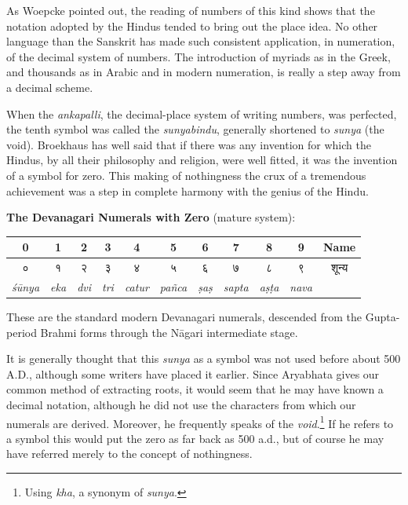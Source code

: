 \documentclass[11pt,a4paper]{article}
\newcommand{\dev}[1]{{\devanagarifont #1}}
\newenvironment{enhancednote}{%
  \begin{tcolorbox}[colback=enhancedbg,colframe=notecolor,boxrule=1pt,
    left=10pt,right=10pt,top=8pt,bottom=8pt,
    title={\textbf{Enhanced Edition Note}},fonttitle=\bfseries\color{notecolor}]
}{\end{tcolorbox}}
\begin{document}
As Woepcke pointed out, the reading of numbers of this kind shows that the notation adopted by the Hindus tended to bring out the place idea. No other language than the Sanskrit has made such consistent application, in numeration, of the decimal system of numbers. The introduction of myriads as in the Greek, and thousands as in Arabic and in modern numeration, is really a step away from a decimal scheme.

When the \textit{ankapalli}, the decimal-place system of writing numbers, was perfected, the tenth symbol was called the \textit{sunyabindu}, generally shortened to \textit{sunya} (the void). Broekhaus has well said that if there was any invention for which the Hindus, by all their philosophy and religion, were well fitted, it was the invention of a symbol for zero. This making of nothingness the crux of a tremendous achievement was a step in complete harmony with the genius of the Hindu.

\begin{enhancednote}
\textbf{The Devanagari Numerals with Zero} (mature system):

\begin{center}
\begin{tabular}{|*{11}{c|}}
\hline
\textbf{0} & \textbf{1} & \textbf{2} & \textbf{3} & \textbf{4} & \textbf{5} & \textbf{6} & \textbf{7} & \textbf{8} & \textbf{9} & \textbf{Name} \\
\hline
\dev{०} & \dev{१} & \dev{२} & \dev{३} & \dev{४} & \dev{५} & \dev{६} & \dev{७} & \dev{८} & \dev{९} & \dev{शून्य} \\
\hline
\textit{\'s\=unya} & \textit{eka} & \textit{dvi} & \textit{tri} & \textit{catur} & \textit{pa\~nca} & \textit{\d{s}a\d{s}} & \textit{sapta} & \textit{a\d{s}\d{t}a} & \textit{nava} & \\
\hline
\end{tabular}
\end{center}

These are the standard modern Devanagari numerals, descended from the Gupta-period Brahmi forms through the N\=agari intermediate stage.
\end{enhancednote}

It is generally thought that this \textit{sunya} as a symbol was not used before about 500 A.D., although some writers have placed it earlier. Since Aryabhata gives our common method of extracting roots, it would seem that he may have known a decimal notation, although he did not use the characters from which our numerals are derived. Moreover, he frequently speaks of the \textit{void}.\footnote{Using \textit{kha}, a synonym of \textit{sunya}.} If he refers to a symbol this would put the zero as far back as 500 a.d., but of course he may have referred merely to the concept of nothingness.
\end{document}
